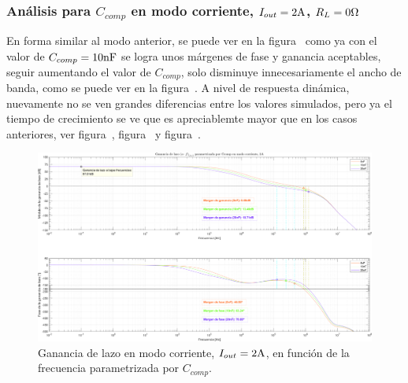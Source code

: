 \clearpage


\subsubsection{Análisis para $C_{comp}$ en modo corriente, $I_{out} = 2 \si[per-mode=symbol]{\ampere}$, $R_{L} = 0 \si[per-mode=symbol]{\ohm}$}

En forma similar al modo anterior, se puede ver en la figura~ como ya con el valor de $C_{comp} = 10 \si[per-mode=symbol]{\nano\farad}$ se logra unos márgenes de fase y ganancia aceptables, seguir aumentando el valor de $C_{comp}$, solo disminuye innecesariamente el ancho de banda, como se puede ver en la figura~. A nivel de respuesta dinámica, nuevamente no se ven grandes diferencias entre los valores simulados, pero ya el tiempo de crecimiento se ve que es apreciablemte mayor que en los casos anteriores, ver figura~, figura~ y figura~.

\vfill



\clearpage

\begin{figure}[H] %
\begin{center}
\includegraphics[width=1.1 \textwidth, angle=90]{./img/plots/loop/power_supply_CCOMP_LOOP_Modo3.png}
\caption{\label{fig:fig_power_supply_CCOMP_LOOP_Modo3}\footnotesize{Ganancia de lazo en modo corriente, $I_{out} = 2 \si[per-mode=symbol]{\ampere}$, en función de la frecuencia parametrizada por $C_{comp}$.}}
\end{center}
\end{figure}


